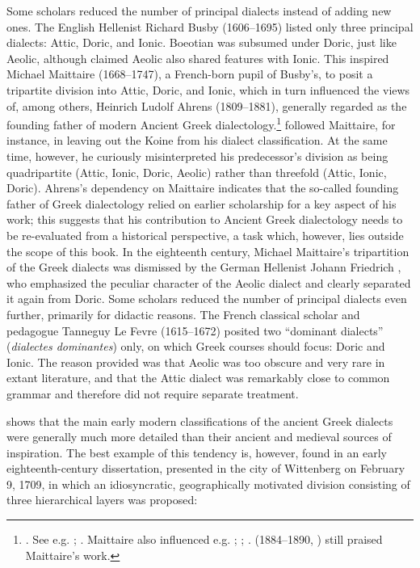 Some scholars reduced the number of principal dialects instead of adding new ones. The English Hellenist Richard Busby (1606–1695) listed only three principal dialects: Attic, Doric, and Ionic. Boeotian was subsumed under Doric, just like Aeolic, although \citet[66--67]{Busby1696} claimed Aeolic also shared features with Ionic. This inspired Michael Maittaire (1668–1747), a French-born pupil of Busby’s, to posit a tripartite division into Attic, Doric, and Ionic, which in turn influenced the views of, among others, Heinrich Ludolf Ahrens (1809–1881), generally regarded as the founding father of modern Ancient Greek dialectology.\footnote{\citet[i–ii]{Maittaire1706}. See e.g. \citet[177]{Brekle2005}; \citet[463]{Finkelberg2014}. Maittaire also influenced e.g. \citet[213]{Thompson1732}; \citet[162]{Gesner1774}; \citet[\textsc{xxviii}]{Harles1778}. \citeauthor{Pott1974} (1884–1890, \citeyear[92]{Pott1974}) still praised Maittaire’s work.} \citet[\textsc{i.}1]{Ahrens1839} followed Maittaire, for instance, in leaving out the Koine from his dialect classification. At the same time, however, he curiously misinterpreted his predecessor’s division as being quadripartite (Attic, Ionic, Doric, Aeolic) rather than threefold (Attic, Ionic, Doric). Ahrens’s dependency on Maittaire indicates that the so-called founding father of Greek dialectology relied on earlier scholarship for a key aspect of his work; this suggests that his contribution to Ancient Greek dialectology needs to be re-evaluated from a historical perspective, a task which, however, lies outside the scope of this book. In the eighteenth century, Michael Maittaire’s tripartition of the Greek dialects was dismissed by the German Hellenist Johann Friedrich \citet[\textsc{iv–v}]{Facius1782}, who emphasized the peculiar character of the Aeolic dialect and clearly separated it again from Doric. Some scholars reduced the number of principal dialects even further, primarily for didactic reasons. The French classical scholar and pedagogue Tanneguy Le Fevre (1615–1672) posited two “dominant dialects” (\textit{dialectes dominantes}) only, on which Greek courses should focus: Doric and Ionic. The reason \citet[61]{Le1731} provided was that Aeolic was too obscure and very rare in extant literature, and that the Attic dialect was remarkably close to common grammar and therefore did not require separate treatment.

 shows that the main early modern classifications of the ancient Greek dialects were generally much more detailed than their ancient and medieval sources of inspiration. The best example of this tendency is, however, found in an early eighteenth-century dissertation, presented in the city of Wittenberg on February 9, 1709, in which an idiosyncratic, geographically motivated division consisting of three hierarchical layers was proposed:

